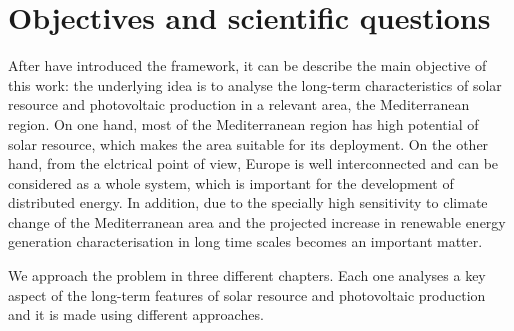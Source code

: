  

\section{Objectives and scientific questions}%


After have introduced the framework, it can be describe the main objective of this work: the underlying idea is to analyse the long-term characteristics of solar resource and photovoltaic production in a relevant area, the Mediterranean region. On one hand, most of the Mediterranean region has high potential of solar resource, which makes the area suitable for its deployment. On the other hand, from the elctrical point of view, Europe is well interconnected and can be considered as a whole system, which is important for the development of distributed energy. In addition, due to the specially high sensitivity to climate change of the Mediterranean area and the projected increase in renewable energy generation characterisation in long time scales becomes an important matter.

We approach the problem in three different chapters. Each one analyses a key aspect of the long-term features of solar resource and photovoltaic production and it is made using different approaches.


